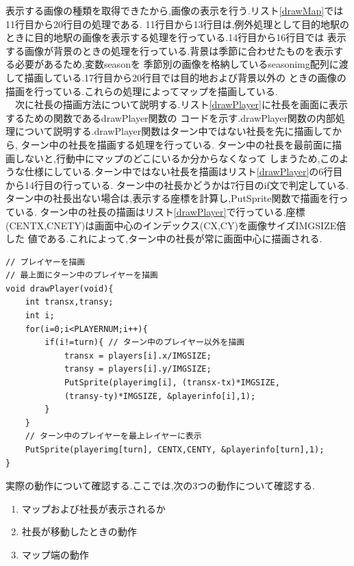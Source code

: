 \documentclass[a4j]{jarticle}
\begin{document}
        表示する画像の種類を取得できたから,画像の表示を行う.リスト\ref{drawMap}では11行目から20行目の処理である.
        11行目から13行目は,例外処理として目的地駅のときに目的地駅の画像を表示する処理を行っている.14行目から16行目では
        表示する画像が背景のときの処理を行っている.背景は季節に合わせたものを表示する必要があるため,変数seasonを
        季節別の画像を格納しているseasonimg配列に渡して描画している.17行目から20行目では目的地および背景以外の
        ときの画像の描画を行っている.これらの処理によってマップを描画している.\\
        　次に社長の描画方法について説明する.リスト\ref{drawPlayer}に社長を画面に表示するための関数であるdrawPlayer関数の
        コードを示す.drawPlayer関数の内部処理について説明する.drawPlayer関数はターン中ではない社長を先に描画してから,
        ターン中の社長を描画する処理を行っている. ターン中の社長を最前面に描画しないと,行動中にマップのどこにいるか分からなくなって
        しまうため,このような仕様にしている.ターン中ではない社長を描画はリスト\ref{drawPlayer}の6行目から14行目の行っている. 
        ターン中の社長かどうかは7行目のif文で判定している.ターン中の社長出ない場合は,表示する座標を計算し,PutSprite関数で描画を行っている.
        ターン中の社長の描画はリスト\ref{drawPlayer}で行っている.座標(CENTX,CNETY)は画面中心のインデックス(CX,CY)を画像サイズIMGSIZE倍した
        値である.これによって,ターン中の社長が常に画面中心に描画される.
        \begin{lstlisting}[basicstyle=\ttfamily\footnotesize, frame=single,label=drawPlayer,caption=drawPlayer関数]
// プレイヤーを描画
// 最上面にターン中のプレイヤーを描画
void drawPlayer(void){
    int transx,transy;
    int i;
    for(i=0;i<PLAYERNUM;i++){
        if(i!=turn){ // ターン中のプレイヤー以外を描画
            transx = players[i].x/IMGSIZE;
            transy = players[i].y/IMGSIZE;
            PutSprite(playerimg[i], (transx-tx)*IMGSIZE,
            (transy-ty)*IMGSIZE, &playerinfo[i],1);
        }
    }
    // ターン中のプレイヤーを最上レイヤーに表示
    PutSprite(playerimg[turn], CENTX,CENTY, &playerinfo[turn],1);
}
        \end{lstlisting}

        実際の動作について確認する.ここでは,次の3つの動作について確認する.
        \begin{enumerate}
            \item マップおよび社長が表示されるか
            \item 社長が移動したときの動作
            \item マップ端の動作
        \end{enumerate}
    
\end{document}
